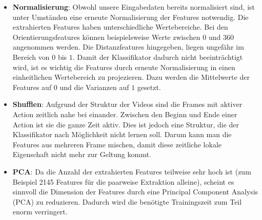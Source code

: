 \begin{itemize}

  \item \textbf{Normalisierung}: Obwohl unsere Eingabedaten bereits normalisiert sind, ist unter Umständen eine erneute Normalisierung der Features notwendig. Die extrahierten
        Features haben unterschiedliche Wertebereiche. Bei den Orientierungsfeatures können beispielsweise Werte zwischen $0$ und $360$ angenommen werden. Die Distanzfeatures hingegeben, liegen
        ungefähr im Bereich von $0$ bis $1$. Damit der Klassifikator dadurch nicht beeinträchtigt wird, ist es wichtig die Features durch erneute Normalisierung in einen einheitlichen
        Wertebereich zu projezieren. Dazu werden die Mittelwerte der Features auf $0$ und die Varianzen auf $1$ gesetzt.

  \item \textbf{Shufflen}:
    Aufgrund der Struktur der Videos sind die Frames mit aktiver Action zeitlich nahe bei einander. Zwischen den Beginn und Ende einer Action ist sie die ganze Zeit aktiv.
    Dies ist jedoch eine Struktur, die der Klassifikator nach Möglichkeit nicht lernen soll. Darum kann man die Features aus mehreren Frame mischen, damit diese zeitliche lokale Eigenschaft nicht mehr zur Geltung kommt.

  \item \textbf{PCA}: Da die Anzahl der extrahierten Features teilweise sehr hoch ist (zum Beispiel 2145 Features für die paarweise Extraktion alleine), scheint es  sinnvoll die Dimension der Features durch eine Principal Component Analysis (PCA) zu reduzieren. Dadurch wird die benötigte Trainingszeit zum Teil enorm verringert.
\end{itemize}

